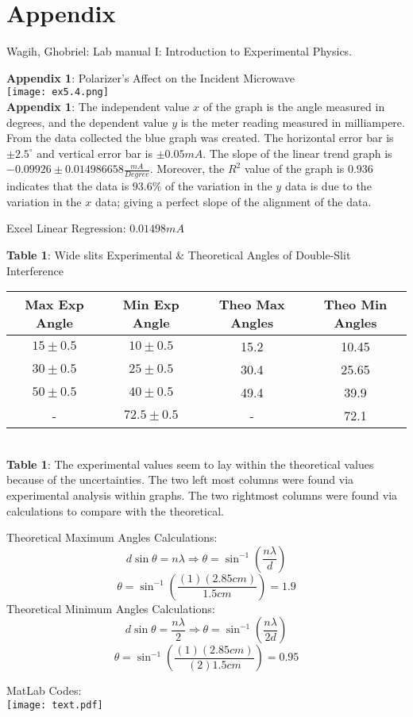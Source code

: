 \documentclass[11pt]{article}
\begin{document}
\newpage
\section*{Appendix}
Wagih, Ghobriel: Lab manual I: Introduction to Experimental Physics.
\begin{center}
    \textbf{Appendix 1}: Polarizer's Affect on the Incident Microwave\\
    \texttt{[image: ex5.4.png]}\\\textbf{Appendix 1}: The independent value $x$ of the graph is the angle measured in degrees, and the dependent value $y$ is the meter reading measured in milliampere. From the data collected the blue graph was created. The horizontal error bar is $\pm 2.5^\circ$ and vertical error bar is $\pm 0.05 mA$. The slope of the linear trend graph is $-0.09926 \pm 0.014986658 \frac{mA}{Degree}$. Moreover, the $R^2$ value of the graph is $0.936$ indicates that the data is $93.6\%$ of the variation in the $y$ data is due to the variation in the $x$ data; giving a perfect slope of the alignment of the data.
\end{center}
Excel Linear Regression: $0.01498mA$
\begin{center}
 \caption{\textbf{Table 1}: Wide slits Experimental $\&$ Theoretical Angles of Double-Slit Interference} 
 \begin{tabular}{||c c c c||} 
 \hline
 Max Exp Angle & Min Exp Angle & Theo Max Angles & Theo Min Angles\\ [0.5ex] 
 \hline\hline
 $15\pm0.5$ & $10\pm0.5$ & 15.2 & 10.45\\ 
 \hline
 $30\pm0.5$ & $25\pm0.5$ & 30.4 & 25.65\\
 \hline
 $50\pm0.5$ & $40\pm0.5$ & 49.4 & 39.9\\
 \hline
 - & $72.5\pm0.5$ & - & 72.1\\ [1ex] 
 \hline
\end{tabular}
\\\textbf{Table 1}: The experimental values seem to lay within the theoretical values because of the uncertainties. The two left most columns were found via experimental analysis within graphs. The two rightmost columns were found via calculations to compare with the theoretical. 
\end{center}
Theoretical Maximum Angles Calculations:
\[d\sin\theta=n\lambda \Rightarrow \theta = \sin^{-1}(\frac{n\lambda}{d})\]
\[\theta=\sin^{-1}(\frac{(1)(2.85cm)}{1.5cm})=1.9\]
Theoretical Minimum Angles Calculations:
\[d\sin\theta=\frac{n\lambda}{2} \Rightarrow \theta = \sin^{-1}(\frac{n\lambda}{2d})\]
\[\theta=\sin^{-1}(\frac{(1)(2.85cm)}{(2)1.5cm})=0.95\]
\newpage
\begin{center}
    MatLab Codes:\\
    \texttt{[image: text.pdf]}
\end{center}
\end{document}
